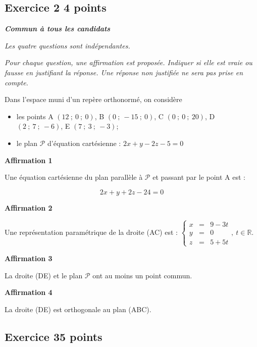 \documentclass[10pt]{article}
\begin{document}
\vspace{0,5cm}

\subsection*{Exercice 2 \hfill 4 points}

\emph{\textbf{Commun à tous les candidats}}

\medskip

\emph{Les quatre questions sont indépendantes.}
 
\emph{Pour chaque question, une affirmation est proposée. Indiquer si elle est vraie ou fausse en justifiant la réponse. Une réponse non justifiée ne sera pas prise en compte.}
\medskip

Dans l'espace muni d'un repère orthonormé, on considère 
\begin{itemize}
\item les points A $(12~;~0~;~0)$, B $( 0~;~-15~;~0)$, C $( 0~;~0~;~20)$, D $(2~;~7~;~- 6)$, E $(7~;~3~;~-3)$;
\item le plan $\mathscr{P}$ d'équation cartésienne : $2x + y - 2z - 5 = 0 $
\end{itemize}

\bigskip

\textbf{Affirmation 1}

Une équation cartésienne du plan parallèle à $\mathscr{P}$ et passant par le point A est :
 
\[2x + y + 2z - 24 = 0\]

\textbf{Affirmation 2}

Une représentation paramétrique de la droite (AC) est : $\left\{\begin{array}{*{3}{l}}x&=&9 - 3t\\y&=&0\\
z&=&5 + 5t\end{array}\right.,~t\in\mathbb{R}$.

\textbf{Affirmation 3}

La droite (DE) et le plan $\mathscr{P}$ ont au moins un point commun.

\textbf{Affirmation 4}

La droite (DE) est orthogonale au plan (ABC).

\vspace{0,5cm}

\subsection*{Exercice 3\hfill 5 points}
\end{document}
